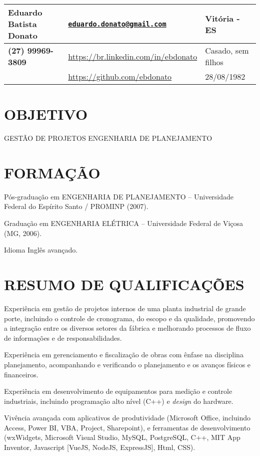 \documentclass[]{article}
\date{}
\begin{document}
\begin{longtable}[]{@{}lll@{}}
\toprule
\textbf{Eduardo Batista Donato} &
\href{mailto:eduardo.donato@gmail.com}{\nolinkurl{eduardo.donato@gmail.com}}
& Vitória - ES\tabularnewline
\midrule
\endhead
\textbf{(27) 99969-3809} & \url{https://br.linkedin.com/in/ebdonato} &
Casado, sem filhos\tabularnewline
& \url{https://github.com/ebdonato} & 28/08/1982\tabularnewline
\bottomrule
\end{longtable}

\section{OBJETIVO}\label{objetivo}

GESTÃO DE PROJETOS \textbar{} ENGENHARIA DE PLANEJAMENTO

\section{FORMAÇÃO}\label{formauxe7uxe3o}

Pós-graduação em ENGENHARIA DE PLANEJAMENTO -- Universidade Federal do
Espírito Santo / PROMINP (2007).

Graduação em ENGENHARIA ELÉTRICA -- Universidade Federal de Viçosa (MG,
2006).

Idioma Inglês avançado.

\section{RESUMO DE QUALIFICAÇÕES}\label{resumo-de-qualificauxe7uxf5es}

Experiência em gestão de projetos internos de uma planta industrial de
grande porte, incluindo o controle de cronograma, do escopo e da
qualidade, promovendo a integração entre os diversos setores da fábrica
e melhorando processos de fluxo de informações e de responsabilidades.

Experiência em gerenciamento e fiscalização de obras com ênfase na
disciplina planejamento, acompanhando e verificando o planejamento e os
avanços físicos e financeiros.

Experiência em desenvolvimento de equipamentos para medição e controle
industriais, incluindo programação alto nível (C++) e \emph{design} do
hardware.

Vivência avançada com aplicativos de produtividade (Microsoft Office,
incluindo Access, Power BI, VBA, Project, Sharepoint), e ferramentas de
desenvolvimento (wxWidgets, Microsoft Visual Studio, MySQL, PostgreSQL,
C++, MIT App Inventor, Javascript {[}VueJS, NodeJS, ExpressJS{]}, Html,
CSS).
\end{document}
